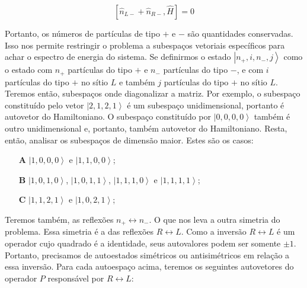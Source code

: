 \begin{equation}
\left[ \hat{n}_{L-} + \hat{n}_{R-}, \hat{H} \right] = 0
\end{equation}

Portanto, os números de partículas de tipo $+$ e $-$ são quantidades conservadas. Isso nos permite restringir o problema a subespaços vetoriais específicos para achar o espectro de energia do sistema. Se definirmos o estado $\left|n_{+},i,n_{-},j \right> $ como o estado com $n_{+}$ partículas do tipo $+$ e $n_{-}$ partículas do tipo $-$, e com $i$ partículas do tipo $+$ no sítio $L$ e também $j$ partículas do tipo $+$ no sítio $L$. Teremos então, subespaços onde diagonalizar a matriz. Por exemplo, o subespaço constituído pelo vetor $\left| 2,1,2,1 \right>$ é um subespaço unidimensional, portanto é autovetor do Hamiltoniano. O subespaço constituído por $\left| 0,0,0,0 \right>$ também é outro unidimensional e, portanto, também autovetor do Hamiltoniano. Resta, então, analisar os subespaços de dimensão maior. Estes são os casos:

\begin{itemize}
\item[\textbf{A}] $\left| 1,0,0,0 \right>$ e $\left| 1,1,0,0 \right>$;
\item[\textbf{B}] $\left| 1,0,1,0 \right>$, $\left| 1,0,1,1 \right>$, $\left| 1,1,1,0 \right>$ e $\left| 1,1,1,1 \right>$;
\item[\textbf{C}] $\left| 1,1,2,1 \right>$ e $\left| 1,0,2,1 \right>$;
\end{itemize}

Teremos também, as reflexões $n_{+} \leftrightarrow n_{-}$. O que nos leva a outra simetria do problema. Essa simetria é a das reflexões $R \leftrightarrow L$. Como a inversão $R \leftrightarrow L$ é um operador cujo quadrado é a identidade, seus autovalores podem ser somente $\pm 1$. Portanto, precisamos de autoestados simétricos ou antisimétricos em relação a essa inversão. Para cada autoespaço acima, teremos os seguintes autovetores do operador $P$ responsável por $R \leftrightarrow L$:

